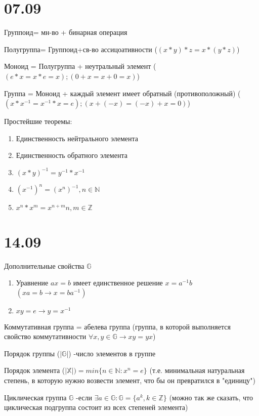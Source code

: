 \documentclass[12pt]{article}
\begin{document}
\section{07.09}
Группоид= мн-во + бинарная операция

Полугруппа= Группоид+св-во ассицоативности ($(x*y)*z=x*(y*z)$)

Моноид = Полугруппа + неутральный элемент ($(e*x=x*e=x) ; (0+x=x+0=x)$)

Группа = Моноид + каждый элемент имеет обратный (противоположный) ($(x*x^{-1}=x^{-1}*x=e) ; (x+(-x)=(-x)+x=0)$)


Простейшие теоремы:\begin{enumerate}
\item Единственность нейтрального элемента
\item Единственность обратного элемента
\item $(x*y)^{-1}=y^{-1}*x^{-1}$
\item $(x^{-1})^n=(x^n)^{-1} , n \in \mathds{N}$
\item $x^n*x^m=x^{n+m} n,m \in \mathds{Z} $ 
\end{enumerate}

\section{14.09}
Дополнительные свойства $\mathds{G}$	
\begin{enumerate}
\item Уравнение $ax=b$ имеет единственное решение $x=a^{-1}b$ 
$(xa=b\rightarrow x=ba^{-1})$
\item $xy=e \rightarrow y=x^{-1} $
\end{enumerate}

Коммутативная группа = абелева группа (группа, в которой выполняется свойство коммутативности $\forall x, y \in \mathds{G} \rightarrow xy=yx$)

Порядок группы ($|\mathds{G}|$) -число элементов в группе

Порядок элемента ($|\mathds{X}|)= min \{ n\in\mathds{N} :x^n=e\}$ (т.е. минимальная натуральная степень, в которую нужно возвести элемент, что бы он превратился в "единицу") 

Циклическая группа $\mathds{G}$ -если $ \exists a \in \mathds{G} : \mathds{G}=\{a^k, k \in \mathds{Z} \}$ (можно так же сказать, что циклическая подгруппа состоит из всех степеней элемента) 
\end{document}
